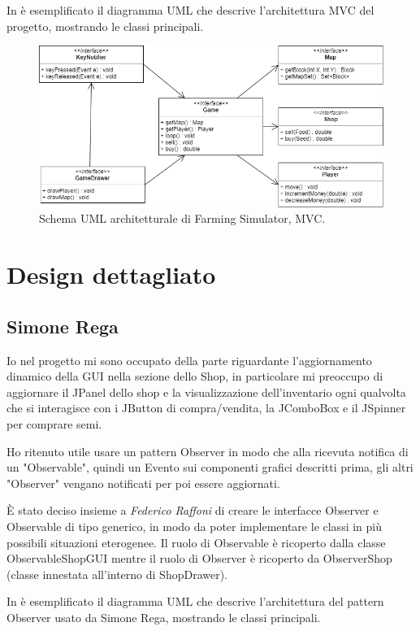 \documentclass[a4paper,12pt]{report}
\begin{document}
\hfill\break
In  è esemplificato il diagramma UML che descrive l'architettura MVC del progetto, mostrando le classi principali.

\hfill\break
\begin{figure}[!htb]
\centerline{\includegraphics[scale=.65]{img/UML_2-1.png}}
\caption{Schema UML architetturale di Farming Simulator, MVC.}
\label{img:MVC}
\end{figure}


\section{Design dettagliato}

\subsection{Simone Rega}
Io nel progetto mi sono occupato della parte riguardante l’aggiornamento dinamico della GUI nella sezione dello Shop, in particolare mi preoccupo di aggiornare il JPanel dello shop e la visualizzazione dell’inventario ogni qualvolta che si interagisce con i JButton di compra/vendita, la JComboBox e il JSpinner per comprare semi. 

Ho ritenuto utile usare un pattern Observer in modo che alla ricevuta notifica di un "Observable", quindi un Evento sui componenti grafici descritti prima, gli altri "Observer" vengano notificati per poi essere aggiornati.

\hfill\break
È stato deciso insieme a\textit{ Federico Raffoni} di creare le interfacce Observer e Observable di tipo generico, in modo da poter implementare le classi in più possibili situazioni eterogenee.
Il ruolo di Observable è ricoperto dalla classe ObservableShopGUI mentre il ruolo di Observer è ricoperto da ObserverShop (classe innestata all’interno di ShopDrawer). 

\hfill\break
In  è esemplificato il diagramma UML che descrive l'architettura del pattern Observer usato da Simone Rega, mostrando le classi principali.
\hfill\break
\end{document}
